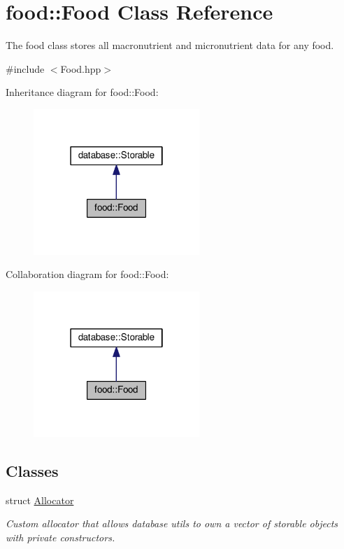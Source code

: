 \hypertarget{classfood_1_1_food}{}\section{food\+:\+:Food Class Reference}
\label{classfood_1_1_food}


The food class stores all macronutrient and micronutrient data for any food.  




{\ttfamily \#include $<$Food.\+hpp$>$}



Inheritance diagram for food\+:\+:Food\+:
\nopagebreak
\begin{figure}[H]
\begin{center}
\leavevmode
\includegraphics[width=178pt]{classfood_1_1_food__inherit__graph}
\end{center}
\end{figure}


Collaboration diagram for food\+:\+:Food\+:
\nopagebreak
\begin{figure}[H]
\begin{center}
\leavevmode
\includegraphics[width=178pt]{classfood_1_1_food__coll__graph}
\end{center}
\end{figure}
\subsection*{Classes}
\begin{DoxyCompactItemize}
\item 
struct \hyperlink{structfood_1_1_food_1_1_allocator}{Allocator}
\begin{DoxyCompactList}\small\item\em Custom allocator that allows database utils to own a vector of storable objects with private constructors. \end{DoxyCompactList}\end{DoxyCompactItemize}
